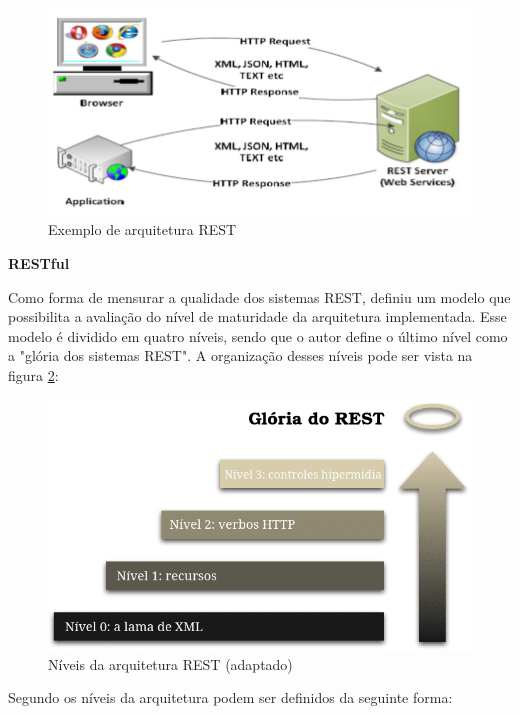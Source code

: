 \begin{figure}[H]
	\centering
	\includegraphics[width=0.9\linewidth]{imagens/rest.png}
	\caption[Exemplo de arquitetura REST]{Exemplo de arquitetura REST \cite{thu2015developing}}
	\label{fig:rest}
\end{figure}

\textbf{RESTful}

Como forma de mensurar a qualidade dos sistemas REST,  definiu um modelo que possibilita a avaliação do nível de maturidade da arquitetura implementada. Esse modelo é dividido em quatro níveis, sendo que o autor define o último nível como a "glória dos sistemas REST". A organização desses níveis pode ser vista na figura \ref{fig:restNiveis}:

\begin{figure}[H]
	\centering
	\includegraphics[width=0.7\linewidth]{imagens/restNiveis.png}
	\caption[Níveis da arquitetura REST]{Níveis da arquitetura REST \cite{fowler2010richardson} (adaptado)}
	\label{fig:restNiveis}
\end{figure}

Segundo  os níveis da arquitetura podem ser definidos da seguinte forma:

